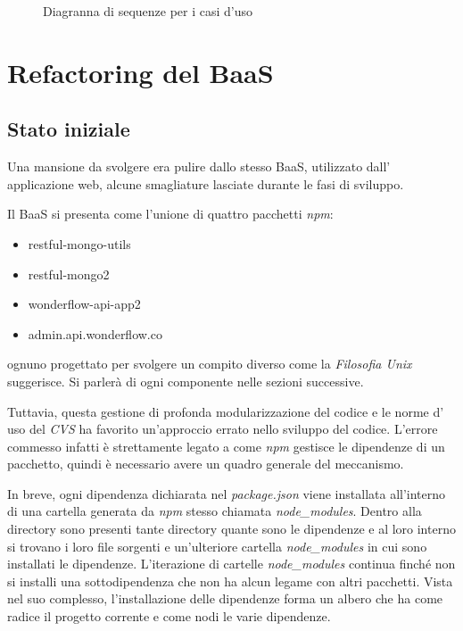 \begin{figure}[H]
\centering
{}
\hfill
{}
\hfill
{}
\hfill
{}
\hfill
{}
\caption{Diagranna di sequenze per i casi d'uso}
\label{fig:uc_user}
\end{figure}

\newpage

\section{Refactoring del BaaS}
\subsection{Stato iniziale}
Una mansione da svolgere era pulire dallo stesso \gls{BaaS}, utilizzato dall'
applicazione web, alcune smagliature lasciate durante le fasi di sviluppo.

Il \gls{BaaS} si presenta come l'unione di quattro pacchetti \textit{npm}:
\begin{itemize}
\item restful-mongo-utils
\item restful-mongo2
\item wonderflow-api-app2
\item admin.api.wonderflow.co
\end{itemize}
ognuno progettato per svolgere un compito diverso come la \textit{Filosofia
Unix} suggerisce. Si parlerà di ogni componente nelle sezioni successive.

Tuttavia, questa gestione di profonda modularizzazione del codice e le norme d'
uso del \textit{CVS} ha favorito un'approccio errato nello sviluppo del codice.
L'errore commesso infatti è strettamente legato a come \textit{npm} gestisce le
dipendenze di un pacchetto, quindi è necessario avere un quadro generale del
meccanismo.

In breve, ogni dipendenza dichiarata nel \textit{package.json} viene installata
all'interno di una cartella generata da \textit{npm} stesso chiamata
\textit{node\_modules}. Dentro alla directory sono presenti tante directory
quante sono le dipendenze e al loro interno si trovano i loro file sorgenti e
un'ulteriore cartella \textit{node\_modules} in cui sono installati le
dipendenze. L'iterazione di cartelle \textit{node\_modules} continua finché non
si installi una sottodipendenza che non ha alcun legame con altri pacchetti.
Vista nel suo complesso, l'installazione delle dipendenze forma un albero che ha
come radice il progetto corrente e come nodi le varie dipendenze.

